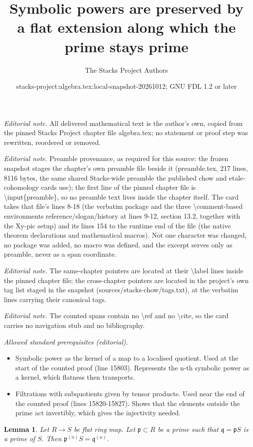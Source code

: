 \documentclass[10pt,a4paper]{amsart}
\title{Symbolic powers are preserved by a flat extension along which the prime stays prime}
\author{The Stacks Project Authors}
\date{stacks-project:algebra.tex:local-snapshot-20261012; GNU FDL 1.2 or later}
\theoremstyle{plain}
\newtheorem{lemma}[subsection]{Lemma}
\theoremstyle{definition}
\theoremstyle{remark}
\numberwithin{equation}{subsection}
\begin{document}
\maketitle
\noindent\textit{Editorial note.} All delivered mathematical text is the author's own, copied from the pinned Stacks Project chapter file algebra.tex; no statement or proof step was rewritten, reordered or removed.\par\medskip
\noindent\textit{Editorial note.} Preamble provenance, as required for this source: the frozen snapshot stages the chapter's own preamble file beside it (preamble.tex, 217 lines, 8116 bytes, the same shared Stacks-wide preamble the published chow and etale-cohomology cards use); the first line of the pinned chapter file is \textbackslash{}input\{preamble\}, so no preamble text lives inside the chapter itself. The card takes that file's lines 8-18 (the verbatim package and the three \textbackslash{}comment-based environments reference/slogan/history at lines 9-12, section 13.2, together with the Xy-pic setup) and its lines 154 to the runtime end of the file (the native theorem declarations and mathematical macros). Not one character was changed, no package was added, no macro was defined, and the excerpt serves only as preamble, never as a span coordinate.\par\medskip
\noindent\textit{Editorial note.} The same-chapter pointers are located at their \textbackslash{}label lines inside the pinned chapter file; the cross-chapter pointers are located in the project's own tag list staged in the snapshot (sources/stacks-chow/tags.txt), at the verbatim lines carrying their canonical tags.\par\medskip
\noindent\textit{Editorial note.} The counted spans contain no \textbackslash{}ref and no \textbackslash{}cite, so the card carries no navigation stub and no bibliography.\par\medskip
\noindent\textit{Allowed standard prerequisites (editorial).}\begin{itemize}
\item Symbolic power as the kernel of a map to a localised quotient. Used at the start of the counted proof (line 15803). Represents the n-th symbolic power as a kernel, which flatness then transports.
\item Filtrations with subquotients given by tensor products. Used near the end of the counted proof (lines 15820-15827). Shows that the elements outside the prime act invertibly, which gives the injectivity needed.
\end{itemize}\medskip
\begin{lemma}
\label{lemma-symbolic-power-flat-extension}
Let $R \to S$ be flat ring map. Let $\mathfrak p \subset R$ be a prime
such that $\mathfrak q = \mathfrak p S$ is a prime of $S$.
Then $\mathfrak p^{(n)} S = \mathfrak q^{(n)}$.
\end{lemma}
\end{document}
